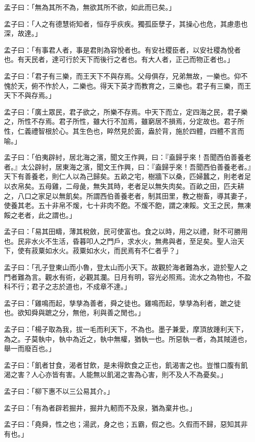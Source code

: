 \documentclass[12pt,a4paper]{ctexbook}
\begin{document}
孟子曰：「無為其所不為，無欲其所不欲，如此而已矣。」\par
孟子曰：「人之有德慧術知者，恒存乎疢疾。獨孤臣孽子，其操心也危，其慮患也深，故達。」\par
孟子曰：「有事君人者，事是君則為容悅者也。有安社稷臣者，以安社稷為悅者也。有天民者，達可行於天下而後行之者也。有大人者，正己而物正者也。」\par
孟子曰：「君子有三樂，而王天下不與存焉。父母俱存，兄弟無故，一樂也。仰不愧於天，俯不怍於人，二樂也。得天下英才而教育之，三樂也。君子有三樂，而王天下不與存焉。」\par
孟子曰：「廣土眾民，君子欲之，所樂不存焉。中天下而立，定四海之民，君子樂之，所性不存焉。君子所性，雖大行不加焉，雖窮居不損焉，分定故也。君子所性，仁義禮智根於心。其生色也，睟然見於面，盎於背，施於四體，四體不言而喻。」\par
孟子曰：「伯夷辟紂，居北海之濱，聞文王作興，曰：『盍歸乎來！吾聞西伯善養老者。』太公辟紂，居東海之濱，聞文王作興，曰：『盍歸乎來！吾聞西伯善養老者。』天下有善養老，則仁人以為己歸矣。五畝之宅，樹牆下以桑，匹婦蠶之，則老者足以衣帛矣。五母雞，二母彘，無失其時，老者足以無失肉矣。百畝之田，匹夫耕之，八口之家足以無飢矣。所謂西伯善養老者，制其田里，教之樹畜，導其妻子，使養其老。五十非帛不煖，七十非肉不飽。不煖不飽，謂之凍餒。文王之民，無凍餒之老者，此之謂也。」\par
孟子曰：「易其田疇，薄其稅斂，民可使富也。食之以時，用之以禮，財不可勝用也。民非水火不生活，昏暮叩人之門戶，求水火，無弗與者，至足矣。聖人治天下，使有菽粟如水火。菽粟如水火，而民焉有不仁者乎？」\par
孟子曰：「孔子登東山而小魯，登太山而小天下。故觀於海者難為水，遊於聖人之門者難為言。觀水有術，必觀其瀾。日月有明，容光必照焉。流水之為物也，不盈科不行；君子之志於道也，不成章不達。」\par
孟子曰：「雞鳴而起，孳孳為善者，舜之徒也。雞鳴而起，孳孳為利者，蹠之徒也。欲知舜與蹠之分，無他，利與善之閒也。」\par
孟子曰：「楊子取為我，拔一毛而利天下，不為也。墨子兼愛，摩頂放踵利天下，為之。子莫執中，執中為近之，執中無權，猶執一也。所惡執一者，為其賊道也，舉一而廢百也。」\par
孟子曰：「飢者甘食，渴者甘飲，是未得飲食之正也，飢渴害之也。豈惟口腹有飢渴之害？人心亦皆有害。人能無以飢渴之害為心害，則不及人不為憂矣。」\par
孟子曰：「柳下惠不以三公易其介。」\par
孟子曰：「有為者辟若掘井，掘井九軔而不及泉，猶為棄井也。」\par
孟子曰：「堯舜，性之也；湯武，身之也；五霸，假之也。久假而不歸，惡知其非有也。」\par
\end{document}
